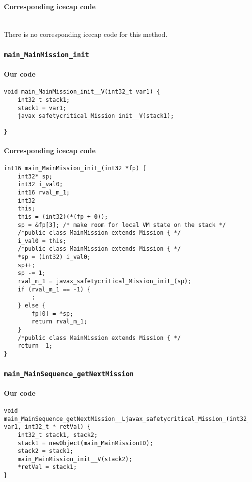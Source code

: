 \paragraph{Corresponding icecap code}\hfill\\
There is no corresponding icecap code for this method.

\subsubsection{\texttt{main\_MainMission\_init}}

\paragraph{Our code}\hfill
\begin{lstlisting}[firstnumber=1871]
void main_MainMission_init__V(int32_t var1) {
	int32_t stack1;
	stack1 = var1;
	javax_safetycritical_Mission_init__V(stack1);

}
\end{lstlisting}

\paragraph{Corresponding icecap code}\hfill
\begin{lstlisting}[firstnumber=55827]
int16 main_MainMission_init_(int32 *fp) {
	int32* sp;
	int32 i_val0;
	int16 rval_m_1;
	int32
	this;
	this = (int32)(*(fp + 0));
	sp = &fp[3]; /* make room for local VM state on the stack */
	/*public class MainMission extends Mission { */
	i_val0 = this;
	/*public class MainMission extends Mission { */
	*sp = (int32) i_val0;
	sp++;
	sp -= 1;
	rval_m_1 = javax_safetycritical_Mission_init_(sp);
	if (rval_m_1 == -1) {
		;
	} else {
		fp[0] = *sp;
		return rval_m_1;
	}
	/*public class MainMission extends Mission { */
	return -1;
}
\end{lstlisting}

\subsubsection{\texttt{main\_MainSequence\_getNextMission}}

\paragraph{Our code}\hfill
\begin{lstlisting}[firstnumber=1983]
void main_MainSequence_getNextMission__Ljavax_safetycritical_Mission_(int32_t var1, int32_t * retVal) {
	int32_t stack1, stack2;
	stack1 = newObject(main_MainMissionID);
	stack2 = stack1;
	main_MainMission_init__V(stack2);
	*retVal = stack1;
}
\end{lstlisting}

